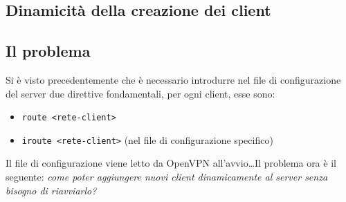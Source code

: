 \subsection{Dinamicità della creazione dei client}
\subsection{Il problema}
Si è visto precedentemente che è necessario introdurre nel file di configurazione del
server due direttive fondamentali, per ogni client, esse sono:
\begin{itemize}
  \item \texttt{route <rete-client>}
  \item \texttt{iroute <rete-client>} (nel file di configurazione specifico)
\end{itemize}
Il file di configurazione viene letto da OpenVPN all'avvio\ldots Il problema ora
è il seguente: \textit{come poter aggiungere nuovi client dinamicamente al server
senza bisogno di riavviarlo?}
